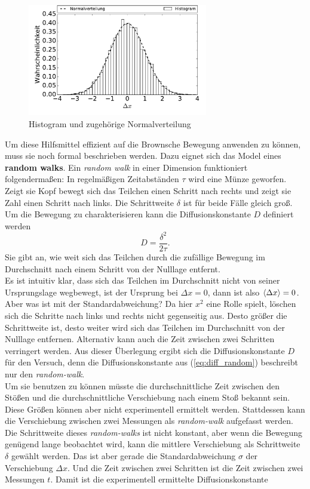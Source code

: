 \begin{figure}[h!]
  \centering
  \includegraphics[width=0.7\textwidth]{figures/histogram}
  \caption{Histogram und zugehörige Normalverteilung}\label{fig:histo}
\end{figure}
Um diese Hilfsmittel effizient auf die Brownsche Bewegung anwenden zu können, muss sie noch formal beschrieben werden. Dazu eignet sich das Model eines \textbf{random walks}. Ein \emph{random walk} in einer Dimension funktioniert folgendermaßen: In regelmäßigen Zeitabständen $\tau$ wird eine Münze geworfen. Zeigt sie Kopf bewegt sich das Teilchen einen Schritt nach rechts und zeigt sie Zahl einen Schritt nach links. Die Schrittweite $\delta$ ist für beide Fälle gleich groß. Um die Bewegung zu charakterisieren kann die Diffusionskonstante $D$ definiert werden
\begin{equation}
  D = \frac{\delta^2}{2 \tau}. \label{eq:diff_random}
\end{equation}
Sie gibt an, wie weit sich das Teilchen durch die zufällige Bewegung im Durchschnitt nach einem Schritt von der Nulllage entfernt.\\
Es ist intuitiv klar, dass sich das Teilchen im Durchschnitt nicht von seiner Ursprungslage wegbewegt, ist der Ursprung bei $\Delta x = 0$, dann ist also $\left< \Delta x \right> = 0$. Aber was ist mit der Standardabweichung? Da hier $x^2$ eine Rolle spielt, löschen sich die Schritte nach links und rechts nicht gegenseitig aus.
Desto größer die Schrittweite ist, desto weiter wird sich das Teilchen im Durchschnitt von der Nulllage entfernen. Alternativ kann auch die Zeit zwischen zwei Schritten verringert werden. Aus dieser Überlegung ergibt sich die Diffusionskonstante $D$ für den Versuch, denn die Diffusionskonstante aus (\ref{eq:diff_random}) beschreibt nur den \emph{random-walk}.\\
Um sie benutzen zu können müsste die durchschnittliche Zeit zwischen den Stößen und die durchschnittliche Verschiebung nach einem Stoß bekannt sein. Diese Größen können aber nicht experimentell ermittelt werden. Stattdessen kann die Verschiebung zwischen zwei Messungen als \emph{random-walk} aufgefasst werden. Die Schrittweite dieses \emph{random-walks} ist nicht konstant, aber wenn die Bewegung genügend lange beobachtet wird, kann die mittlere Verschiebung als Schrittweite $\delta$ gewählt werden. Das ist aber gerade die Standardabweichung $\sigma$ der Verschiebung $\Delta x$. Und die Zeit zwischen zwei Schritten ist die Zeit zwischen zwei Messungen $t$. Damit ist die experimentell ermittelte Diffusionskonstante
